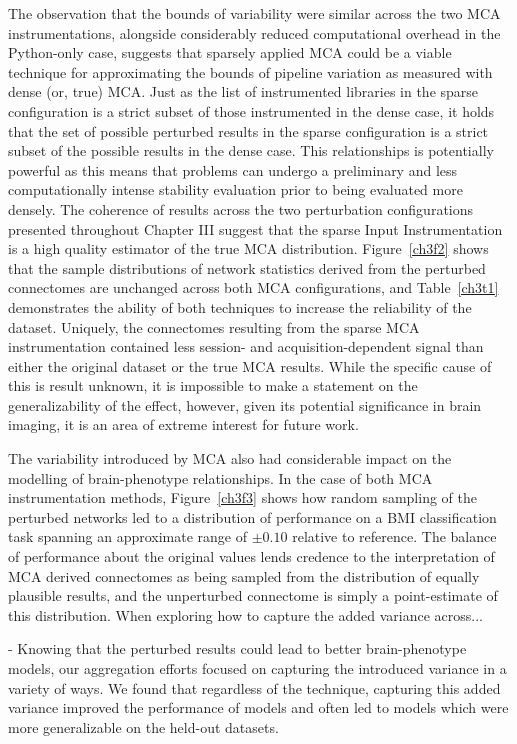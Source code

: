 The observation that the bounds of variability were similar across the two MCA instrumentations, alongside
considerably reduced computational overhead in the Python-only case, suggests that sparsely applied MCA could be a
viable technique for approximating the bounds of pipeline variation as measured with dense (or, true) MCA. Just as
the list of instrumented libraries in the sparse configuration is a strict subset of those instrumented in the
dense case, it holds that the set of possible perturbed results in the sparse configuration is a strict subset of
the possible results in the dense case. This relationships is potentially powerful as this means that problems can
undergo a preliminary and less computationally intense stability evaluation prior to being evaluated more densely.
The coherence of results across the two perturbation configurations presented throughout Chapter III suggest that
the sparse Input Instrumentation is a high quality estimator of the true MCA distribution. Figure~\ref{ch3f2}
shows that the sample distributions of network statistics derived from the perturbed connectomes are unchanged
across both MCA configurations, and Table~\ref{ch3t1} demonstrates the ability of both techniques to increase the
reliability of the dataset. Uniquely, the connectomes resulting from the sparse MCA instrumentation contained less
session- and acquisition-dependent signal than either the original dataset or the true MCA results. While the
specific cause of this is result unknown, it is impossible to make a statement on the generalizability of the
effect, however, given its potential significance in brain imaging, it is an area of extreme interest for future
work.

The variability introduced by MCA also had considerable impact on the modelling of brain-phenotype relationships.
In the case of both MCA instrumentation methods, Figure~\ref{ch3f3} shows how random sampling of the perturbed
networks led to a distribution of performance on a BMI classification task spanning an approximate range of
$\pm 0.10$ relative to reference. The balance of performance about the original values lends credence to the
interpretation of MCA derived connectomes as being sampled from the distribution of equally plausible results,
and the unperturbed connectome is simply a point-estimate of this distribution. When exploring how to capture
the added variance across...

- Knowing that the perturbed results could lead to better brain-phenotype models, our aggregation efforts focused on
capturing the introduced variance in a variety of ways. We found that regardless of the technique, capturing this
added variance improved the performance of models and often led to models which were more generalizable on the
held-out datasets.

